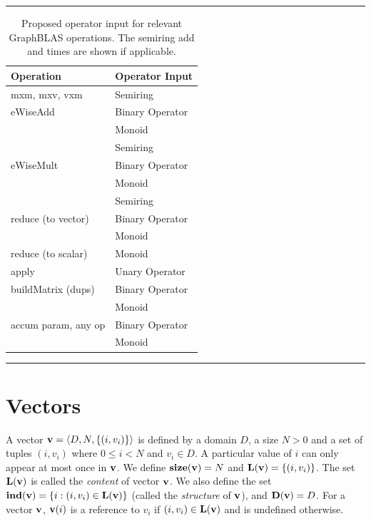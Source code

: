 \begin{table}
    \hrule
    \begin{center}
        \caption{Proposed operator input for relevant GraphBLAS operations. 
        The semiring add and times are shown if applicable.}
        \label{Tab:OperatorInputType}
        \begin{tabular}{l|l}
        Operation           & Operator Input  \\ \hline
        {\sf mxm, mxv, vxm} & Semiring \\ \hline
        {\sf eWiseAdd}      & Binary Operator   \\
                            & Monoid           \\
                            & Semiring          \\ \hline
        {\sf eWiseMult}     & Binary Operator   \\
                            & Monoid          \\
                            & Semiring         \\ \hline
  {\sf reduce} (to vector)  & Binary Operator            \\ 
                            & Monoid           \\ \hline
  {\sf reduce} (to scalar)  & Monoid           \\ \hline
        {\sf apply}         & Unary Operator   \\ \hline
  {\sf buildMatrix} (dups)  & Binary Operator   \\
                            & Monoid           \\ \hline
{\sf accum} param, any op   & Binary Operator  \\
                            & Monoid            \\ 
        \end{tabular}
    \end{center}
    \hrule
\end{table}

\section{Vectors}
\label{Sec:Vectors}

A vector ${\bf v} = \langle D, N, \{ (i,v_i) \} \rangle$ is defined by
a domain $D$, a size $N>0$ and a set of tuples $(i,v_i)$ where $0 \leq
i < N$ and $v_i \in D$. A particular value of $i$ can only appear at
most once in ${\bf v}$. We define $\bold{size}({\bf v}) = N$ and
$\bold{L}({\bf v}) = \{ (i,v_i) \}$. The set $\bold{L}({\bf v})$ is
called the \emph{content} of vector ${\bf v}$. We also define the set
${\bf ind({\bf v})} = \{ i : (i,v_i) \in \bold{L}({\bf v}) \}$
(called the \emph{structure} of ${\bf v}$), and $\bold{D}({\bf v})
= D$. For a vector ${\bf v}$, ${\bf v}(i)$ is a reference to $v_i$
if $(i,v_i) \in \bold{L}({\bf v})$ and is undefined otherwise.

